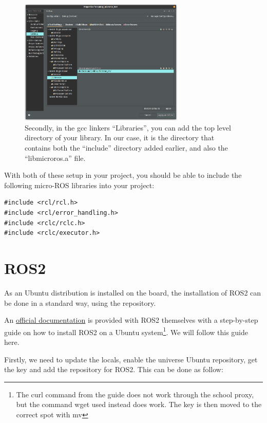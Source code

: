 \documentclass[10pt]{article}
\begin{document}
\begin{figure}[H]
  \centering
  \includegraphics[width=0.7\textwidth]{./img/vitis_new/include2}
  \caption{Secondly, in the gcc linkers ``Libraries'', you can add the top level directory of your library. In our case, it is the
    directory that contains both the ``include'' directory added earlier, and also the ``libmicroros.a'' file.}
  \label{fig:include2}
\end{figure}

With both of these setup in your project, you should be able to include the following micro-ROS libraries into your project:
\begin{tcolorbox}
\begin{verbatim}
#include <rcl/rcl.h>
#include <rcl/error_handling.h>
#include <rclc/rclc.h>
#include <rclc/executor.h>
\end{verbatim}
\end{tcolorbox}


\pagebreak
\section{ROS2}
\label{sec:ros2}
As an Ubuntu distribution is installed on the board, the installation of ROS2 can be done
in a standard way, using the repository.

An \href{https://docs.ros.org/en/humble/Installation/Ubuntu-Install-Debians.html}{official documentation}
is provided with ROS2 themselves with a step-by-step guide on how to install
ROS2 on a Ubuntu system\footnote{The curl command from the guide does not work through the school proxy,
  but the command wget used instead does work. The key is then moved to the correct spot with mv}.
We will follow this guide here.

Firstly, we need to update the locals,  enable the universe Ubuntu repository, get the key and add the repository for ROS2. This can be done as follow:
\end{document}
